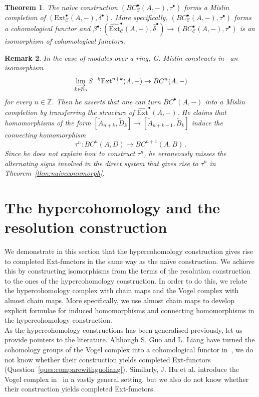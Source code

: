 \documentclass[12pt,a4paper]{article}
\numberwithin{equation}{section}
\newtheorem{thm}{Theorem}[section]
\newtheorem{rem}[thm]{Remark}
\theoremstyle{nonumberplain}
\begin{document}
\begin{thm}\label{thm:resolbenson}
The naïve construction $(BC_{\mathcal{C}}^{\bullet}(A, -), \tau^{\bullet})$ forms a Mislin completion of $(\mathrm{Ext}_{\mathcal{C}}^{\bullet}(A, -), \delta^{\bullet})$. More specifically, $(BC_{\mathcal{C}}^{\bullet}(A, -), \tau^{\bullet})$ forms a cohomological functor and $\beta^{\bullet}: (\widehat{\mathrm{Ext}}_{\mathcal{C}}^{\bullet}(A, -), \widehat{\delta}^{\bullet}) \rightarrow (BC_{\mathcal{C}}^{\bullet}(A, -), \tau^{\bullet})$ is an isomorphism of cohomological functors.
\end{thm}

\begin{rem}\label{rem:mislinsmistake}
In the case of modules over a ring, G.\! Mislin constructs in~\cite[p.~299]{mis94} an isomorphism
\[ \varinjlim_{k \in \mathbb{N}_0} S^{-k}\mathrm{Ext}^{n+k}(A, -) \rightarrow BC^n(A, -) \]
for every $n \in \mathbb{Z}$. Then he asserts that one can turn $BC^{\bullet}(A, -)$ into a Mislin completion by transferring the structure of $\widehat{\mathrm{Ext}}^{\bullet}(A, -)$. He claims that homomorphisms of the form $[\widetilde{A}_{n+k}, \widetilde{D}_k] \rightarrow [\widetilde{A}_{n+k+1}, \widetilde{B}_k]$ induce the connecting homomorphism
\[ \tau^n: BC^n(A, D) \rightarrow BC^{n+1}(A, B) \, . \]
Since he does not explain how to construct $\tau^n$, he erroneously misses the alternating signs involved in the direct system that gives rise to $\tau^n$ in Theorem~\ref{thm:naiveconnmorph}.
\end{rem}

\section{The hypercohomology and the resolution construction}\label{sec:hypercohom}

We demonstrate in this section that the hypercohomology construction gives rise to completed Ext-functors in the same way as the naïve construction. We achieve this by constructing isomorphisms from the terms of the resolution construction to the ones of the hypercohomology construction. In order to do this, we relate the hypercohomology complex with chain maps and the Vogel complex with almost chain maps. More specifically, we use almost chain maps to develop explicit formulae for induced homomorphisms and connecting homomorphisms in the hypercohomology construction. \\

As the hypercohomology constructions has been generalised previously, let us provide pointers to the literature. Although S.\! Guo and L.\! Liang have turned the cohomology groups of the Vogel complex into a cohomological functor in~\cite[Proposition~4.8]{guo23}, we do not know whether their construction yields completed Ext-functors (Question~\ref{ques:comparewithguoliang}). Similarly, J.\! Hu et al.\! introduce the Vogel complex in~\cite[p.~7]{hu21} in a vastly general setting, but we also do not know whether their construction yields completed Ext-functors.
\end{document}
